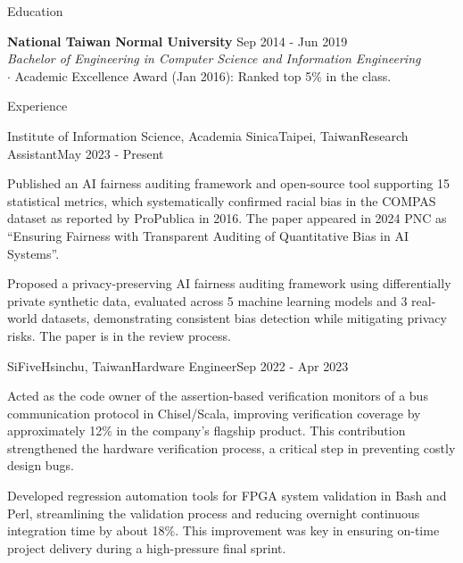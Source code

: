 \documentclass{resume} %
\begin{document}
\begin{rSection}{Education}

{\bf National Taiwan Normal University} \hfill {Sep 2014 - Jun 2019} \\
{\em Bachelor of Engineering in Computer Science and Information Engineering} \\
$\cdot$ Academic Excellence Award (Jan 2016): Ranked top 5\% in the class.

\end{rSection}

\begin{rSection}{Experience}

\begin{rSubsection}{Institute of Information Science, Academia Sinica}{Taipei, Taiwan}{Research Assistant}{May 2023 - Present}
\item Published an AI fairness auditing framework and open-source tool supporting 15 statistical metrics, which systematically confirmed racial bias in the COMPAS dataset as reported by ProPublica in 2016. The paper appeared in 2024 PNC as ``Ensuring Fairness with Transparent Auditing of Quantitative Bias in AI Systems''.
\item Proposed a privacy-preserving AI fairness auditing framework using differentially private synthetic data, evaluated across 5 machine learning models and 3 real-world datasets, demonstrating consistent bias detection while mitigating privacy risks. The paper is in the review process.
\end{rSubsection}

\begin{rSubsection}{SiFive}{Hsinchu, Taiwan}{Hardware Engineer}{Sep 2022 - Apr 2023}
\item Acted as the code owner of the assertion-based verification monitors of a bus communication protocol in Chisel/Scala, improving verification coverage by approximately 12\% in the company's flagship product. This contribution strengthened the hardware verification process, a critical step in preventing costly design bugs.
\item Developed regression automation tools for FPGA system validation in Bash and Perl, streamlining the validation process and reducing overnight continuous integration time by about 18\%. This improvement was key in ensuring on-time project delivery during a high-pressure final sprint.
\end{rSubsection}


\end{rSection}
\end{document}
